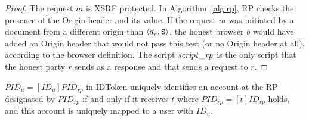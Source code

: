   \begin{proof}
    The request $m$ is XSRF protected. In Algorithm~\ref{alg:rp}, 
    RP checks the presence of the Origin header and its value. 
    If the request $m$ was initiated by a document from a 
    different origin than $\langle d_r, \mathtt{S}\rangle$, the honest browser 
    $b$ would have added an Origin header that would not 
    pass this test (or no Origin header at all), according to 
    the browser definition. The script $\mathit{script\_rp}$ is the 
    only script that the honest party $r$ sends as a response 
    and that sends a request to $r$.
  \end{proof}
  
  \begin{lemma}\label{user-identification}
    $PID_u= [ID_u]PID_{rp}$ in IDToken uniquely identifies an 
    account at the RP designated by $PID_{rp}$ if and only if 
    it receives $t$ where $PID_{rp} = [t]ID_{rp}$ holds, and 
    this account is uniquely mapped to a user with $ID_u$.
  \end{lemma}
